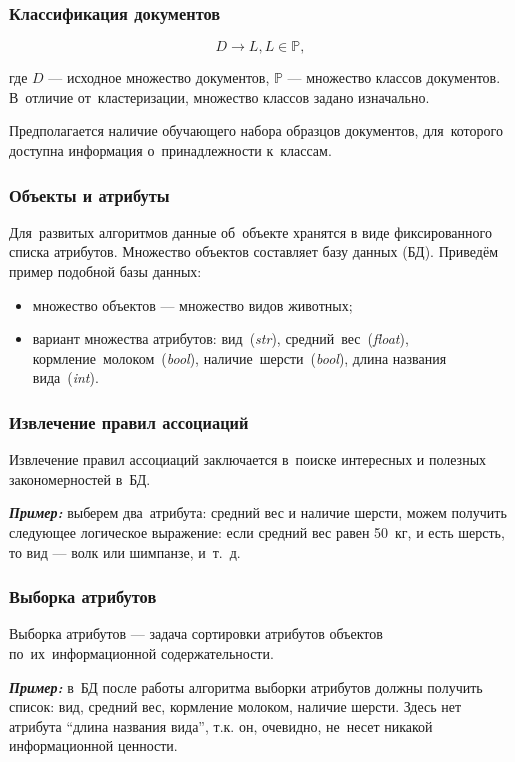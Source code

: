 \documentclass{beamer}
\newcommand{\MARK}[1]{{\bf {\it #1}}}
\begin{document}
\begin{frame}
\frametitle{Классификация документов}
$$D \to L, L \in \mathbb{P},$$

\vspace{1cm}

где $D$ --- исходное множество документов, 
$\mathbb{P}$ --- множество классов документов.
В~отличие от~кластеризации, множество классов задано изначально.

\vspace{5mm}

Предполагается наличие обучающего набора образцов документов, 
для~которого доступна информация о~принадлежности к~классам.
\end{frame}

\begin{frame}
\frametitle{Объекты и атрибуты}

Для~развитых алгоритмов данные  об~объекте хранятся в виде фиксированного списка атрибутов.
Множество объектов составляет базу данных (БД).
Приведём пример подобной базы данных:

\begin{itemize}
\item {множество объектов --- множество видов животных;}
\vspace{1cm}
\item {вариант множества атрибутов:
вид~({\it str}),
средний~вес~({\it float}),
кормление~молоком~({\it bool}),
 наличие~шерсти~({\it bool}),
длина названия вида~({\it int}).
}
\end{itemize}
\end{frame}

\begin{frame}
\frametitle{Извлечение правил ассоциаций}

Извлечение правил ассоциаций заключается в~поиске интересных и полезных закономерностей в~БД.

\vspace{1cm}

\MARK{Пример:}
выберем два~атрибута: средний вес и наличие шерсти,
можем получить следующее логическое выражение:
если средний вес равен 50~кг, и есть шерсть, то вид --- волк или шимпанзе, и~т.~д.
\end{frame}

\begin{frame}
\frametitle{Выборка атрибутов}
Выборка атрибутов --- задача сортировки атрибутов объектов по~их~информационной содержательности.

\vspace{1cm}

\MARK{Пример:}
в~БД после работы алгоритма выборки атрибутов должны получить список:
вид,
средний вес,
кормление молоком,
наличие шерсти.
Здесь нет атрибута ``длина названия вида'',
т.к. он, очевидно, не~несет никакой информационной ценности.
\end{frame}
\end{document}
